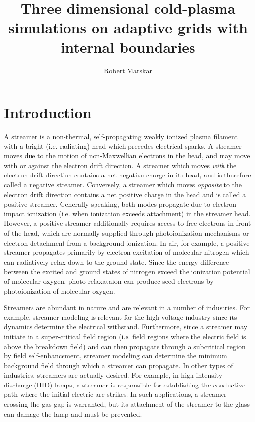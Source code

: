 \documentclass[3p]{elsarticle}
\title{Three dimensional cold-plasma simulations on adaptive grids with internal boundaries}
\author[sintef]{Robert Marskar}
\begin{document}
\begin{abstract}

\end{abstract}
\maketitle

\section{Introduction}
A streamer is a non-thermal, self-propagating weakly ionized plasma filament with a bright (i.e. radiating) head which precedes electrical sparks. A streamer moves due to the motion of non-Maxwellian electrons in the head, and may move with or against the electron drift direction. A streamer which moves \emph{with} the electron drift direction contains a net negative charge in its head, and is therefore called a negative streamer. Conversely, a streamer which moves \emph{opposite} to the electron drift direction contains a net positive charge in the head and is called a positive streamer. Generally speaking, both modes propagate due to electron impact ionization (i.e. when ionization exceeds attachment) in the streamer head. However, a positive streamer additionally requires access to free electrons in front of the head, which are normally supplied through photoionization mechanisms or electron detachment from a background ionization. In air, for example, a positive streamer propagates primarily by electron excitation of molecular nitrogen which can radiatively relax down to the ground state. Since the energy difference between the excited and ground states of nitrogen exceed the ionization potential of molecular oxygen, photo-relaxataion can produce seed electrons by photoionization of molecular oxygen. 

Streamers are abundant in nature and are relevant in a number of industries. For example, streamer modeling is relevant for the high-voltage industry since its dynamics determine the electrical withstand. Furthermore, since a streamer may initiate in a super-critical field region (i.e. field regions where the electric field is above the breakdown field) and can then propagate through a subcritical region by field self-enhancement, streamer modeling can determine the minimum background field through which a streamer can propagate. In other types of industries, streamers are actually desired. For example, in high-intensity discharge (HID) lamps, a streamer is responsible for establishing the conductive path where the initial electric arc strikes. In such applications, a streamer crossing the gas gap is warranted, but its attachment of the streamer to the glass can damage the lamp and must be prevented. 
\end{document}
